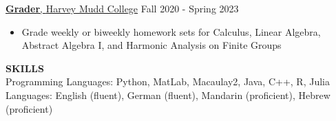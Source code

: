 \documentclass[11pt]{article}
\newcommand{\hdr}[1]{\textcolor{blue(ryb)}{\textbf{#1}}}
\newcommand{\role}[3]{\underline{\textbf{#1}, {#2}} \hfill #3}
\begin{document}
\smallskip
\role{Grader}{Harvey Mudd College}{Fall 2020 - Spring 2023}\\
\begin{itemize}
\item Grade weekly or biweekly homework sets for Calculus, Linear Algebra, Abstract Algebra I, and Harmonic Analysis on Finite Groups   
\end{itemize}
\bigskip
\hdr{SKILLS}\\
Programming Languages: Python, MatLab, Macaulay2, Java, C++, R, Julia\\
Languages: English (fluent), German (fluent), Mandarin (proficient), Hebrew (proficient)
\end{document}

